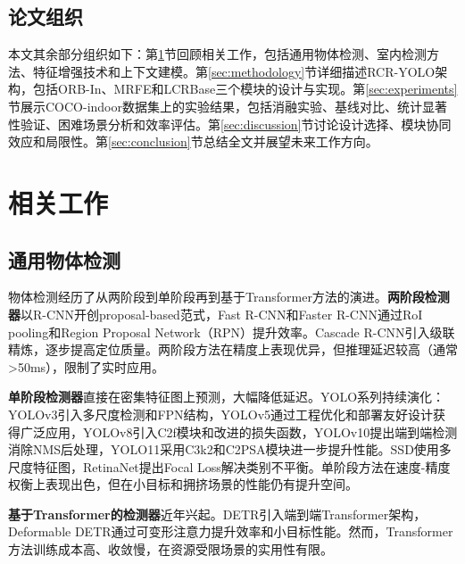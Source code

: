 \documentclass[journal]{IEEEtran}
\begin{document}
\subsection{论文组织}
\label{subsec:organization}

本文其余部分组织如下：第\ref{sec:related_work}节回顾相关工作，包括通用物体检测、室内检测方法、特征增强技术和上下文建模。第\ref{sec:methodology}节详细描述RCR-YOLO架构，包括ORB-In、MRFE和LCRBase三个模块的设计与实现。第\ref{sec:experiments}节展示COCO-indoor数据集上的实验结果，包括消融实验、基线对比、统计显著性验证、困难场景分析和效率评估。第\ref{sec:discussion}节讨论设计选择、模块协同效应和局限性。第\ref{sec:conclusion}节总结全文并展望未来工作方向。

\section{相关工作}
\label{sec:related_work}

\subsection{通用物体检测}
\label{subsec:general_detection}

物体检测经历了从两阶段到单阶段再到基于Transformer方法的演进。\textbf{两阶段检测器}以R-CNN\cite{girshick2014rcnn}开创proposal-based范式，Fast R-CNN\cite{girshick2015fast}和Faster R-CNN\cite{ren2015faster}通过RoI pooling和Region Proposal Network（RPN）提升效率。Cascade R-CNN\cite{cai2018cascade}引入级联精炼，逐步提高定位质量。两阶段方法在精度上表现优异，但推理延迟较高（通常>50ms），限制了实时应用。

\textbf{单阶段检测器}直接在密集特征图上预测，大幅降低延迟。YOLO系列\cite{redmon2016yolo,redmon2017yolo9000,bochkovskiy2020yolov4}持续演化：YOLOv3引入多尺度检测和FPN结构，YOLOv5通过工程优化和部署友好设计获得广泛应用，YOLOv8\cite{ultralytics2023yolov8}引入C2f模块和改进的损失函数，YOLOv10\cite{wang2024yolov10}提出端到端检测消除NMS后处理，YOLO11\cite{ultralytics2023yolo11}采用C3k2和C2PSA模块进一步提升性能。SSD\cite{liu2016ssd}使用多尺度特征图，RetinaNet\cite{lin2017focal}提出Focal Loss解决类别不平衡。单阶段方法在速度-精度权衡上表现出色，但在小目标和拥挤场景的性能仍有提升空间。

\textbf{基于Transformer的检测器}近年兴起。DETR\cite{carion2020detr}引入端到端Transformer架构，Deformable DETR\cite{zhu2020deformable}通过可变形注意力提升效率和小目标性能。然而，Transformer方法训练成本高、收敛慢，在资源受限场景的实用性有限。
\end{document}
